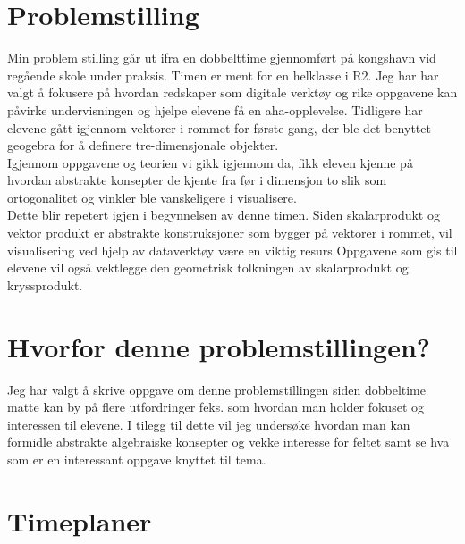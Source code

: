 \documentclass{article}
\date{}
\title{}
\begin{document}
\section*{Problemstilling}
\label{sec-1}
Min problem stilling går ut ifra en dobbelttime gjennomført på kongshavn vid regående skole under praksis.
Timen er ment for en helklasse i R2. Jeg har har valgt å fokusere på hvordan redskaper som 
digitale verktøy  og rike oppgavene kan påvirke undervisningen og hjelpe elevene få en aha-opplevelse.
Tidligere har elevene gått igjennom vektorer i rommet for første gang, der ble det benyttet geogebra
for å definere tre-dimensjonale objekter.\\
Igjennom oppgavene og teorien vi gikk igjennom da, fikk eleven kjenne på hvordan abstrakte konsepter de 
kjente fra før i dimensjon to slik som ortogonalitet og vinkler ble vanskeligere i visualisere.\\
Dette blir repetert igjen i begynnelsen av denne timen. Siden skalarprodukt og vektor produkt er abstrakte konstruksjoner som bygger på vektorer i rommet,
 vil visualisering ved hjelp av dataverktøy være en viktig resurs Oppgavene som gis til elevene vil også vektlegge den geometrisk tolkningen av skalarprodukt og kryssprodukt.\\

\section*{Hvorfor denne problemstillingen?}
Jeg har valgt å skrive oppgave om denne problemstillingen siden dobbeltime matte kan by på flere utfordringer feks. som hvordan man holder fokuset og interessen til elevene.
I tilegg til dette vil jeg undersøke hvordan man kan formidle abstrakte algebraiske konsepter og vekke interesse for feltet samt se hva som er en interessant oppgave knyttet til tema.
\newpage
\section*{Timeplaner}
\label{sec-2}
\end{document}
